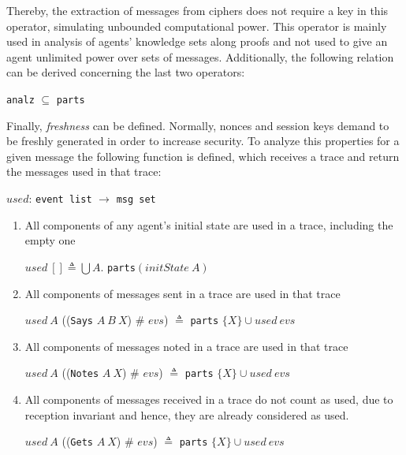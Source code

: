 Thereby, the extraction of messages from ciphers does not require a key in this operator, simulating unbounded computational power. This operator is mainly used in analysis of agents' knowledge sets along proofs and not used to give an agent unlimited power over sets of messages. Additionally, the following relation can be derived concerning the last two operators:

\begin{center}
  \texttt{analz} \(\subseteq \) \texttt{parts}
\end{center}

Finally, \textit{freshness} can be defined. Normally, nonces and session keys demand to be freshly generated in order to increase security. To analyze this properties for a given message the following function is defined, which receives a trace and return the messages used in that trace:

\begin{center}
  \(used\): \texttt{event list} \(\longrightarrow \) \texttt{msg set}
\end{center}

\begin{enumerate}
  \item All components of any agent's initial state are used in a trace, including the empty one
  \begin{center}
    \(used\ [] \triangleq \bigcup A\). \texttt{parts}\( (initState\ A)\)
  \end{center}
  \item All components of messages sent in a trace are used in that trace
  \begin{center}
    \(used\ A\) ((\texttt{Says} \(A\ B\ X\)) \# \(evs\)) \(\triangleq \) \texttt{parts} \( \{X\} \cup used\ evs\)
  \end{center}
  \item All components of messages noted in a trace are used in that trace
  \begin{center}
    \(used\ A\) ((\texttt{Notes} \(A\ X\)) \# \(evs\)) \(\triangleq \) \texttt{parts} \( \{X\} \cup used\ evs\)
  \end{center}
  \item All components of messages received in a trace do not count as used, due to reception invariant and hence, they are already considered as used.
  \begin{center}
    \(used\ A\) ((\texttt{Gets} \(A\ X\)) \# \(evs\)) \(\triangleq \) \texttt{parts} \( \{X\} \cup used\ evs\)
  \end{center}
\end{enumerate}

